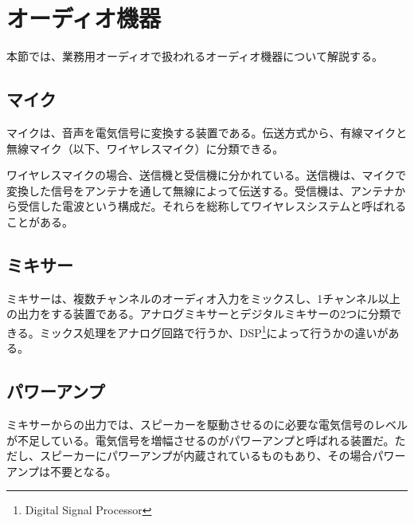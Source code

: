 \section{オーディオ機器}


本節では、業務用オーディオで扱われるオーディオ機器について解説する。

\subsection{マイク}

マイクは、音声を電気信号に変換する装置である。伝送方式から、有線マイクと無線マイク（以下、ワイヤレスマイク）に分類できる。

ワイヤレスマイクの場合、送信機と受信機に分かれている。送信機は、マイクで変換した信号をアンテナを通して無線によって伝送する。受信機は、アンテナから受信した電波という構成だ。それらを総称してワイヤレスシステムと呼ばれることがある。


\subsection{ミキサー}

ミキサーは、複数チャンネルのオーディオ入力をミックスし、1チャンネル以上の出力をする装置である。アナログミキサーとデジタルミキサーの2つに分類できる。ミックス処理をアナログ回路で行うか、DSP\footnote{Digital Signal Processor}によって行うかの違いがある。


\subsection{パワーアンプ}

ミキサーからの出力では、スピーカーを駆動させるのに必要な電気信号のレベルが不足している。電気信号を増幅させるのがパワーアンプと呼ばれる装置だ。ただし、スピーカーにパワーアンプが内蔵されているものもあり、その場合パワーアンプは不要となる。

